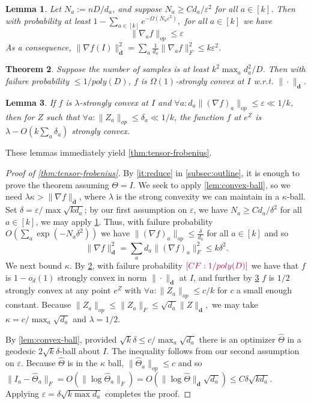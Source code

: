 \documentclass{article}
\newtheorem{theorem}{Theorem}
\newtheorem{lemma}[theorem]{Lemma}
\renewcommand{\vec}{\bm}
\newcommand\eps{\varepsilon}
\newcommand{\CF}[1]{{\color{purple}[CF: #1]}}
\begin{document}
\begin{lemma}\label{lemma:gradient-bound} Let $N_a := n D/d_a$, and suppose $N_a \geq C d_a/\eps^2$ for all $a \in [k]$. Then with probability at least $1 -  \sum_{a \in [k]} e^{-\Omega(N_a \eps^2)},$ for all $a \in [k]$ we have 
$$\| \nabla_a f \|_{op} \leq \eps$$
As a consequence, $\|\nabla f(I)\|_{\vec d} ^{2} = \sum_{a}\frac{1}{d_a} \|\nabla_a f \|_{F}^{2} \leq k \eps^{2}$. 
\end{lemma}

\begin{theorem}\label{thm:tensor-convexity}
Suppose the number of samples is at least $k^{2} \max_{a} d_{a}^{2}/D$. Then with failure probability $\leq 1/poly(D)$, $f$ is $\Omega(1)$-strongly convex at $I$ w.r.t. $\|\cdot \|_{\vec d}$.
\end{theorem}

\begin{lemma}\label{lem:perturbation}
If $f$ is $\lambda$-strongly convex at $I$ and $\forall a: d_{a} \|(\nabla f)_{a}\|_{op} \leq \eps \ll 1/k$, then for $Z$ such that $\forall a: \|Z_{a}\|_{op} \leq \delta_{a} \ll 1/k$, the function $f$ at $e^{Z}$ is $\lambda - O(k \sum_{a} \delta_{a})$ strongly convex. 
\end{lemma}

These lemmas immediately yield \cref{thm:tensor-frobenius}. 
\begin{proof}[Proof of \cref{thm:tensor-frobenius}]By \cref{it:reduce} in \cref{subsec:outline}, it is enough to prove the theorem assuming $\Theta = I$. 
We seek to apply \cref{lem:convex-ball}, so we need $\lambda \kappa > \|\nabla f\|_{\vec d}$, where $\lambda$ is the strong convexity we can maintain in a $\kappa$-ball. Set $\delta = \eps/\max \sqrt{k d_a}$; by our first assumption on $\eps$, we have $N_a \geq C d_a/\delta^2$ for all $a \in [k]$, we may apply \cref{lemma:gradient-bound}. Thus, with failure probability $O\left( \sum_a \exp ( - N_a \delta^2)\right)$ we have $\|(\nabla f)_{a}\|_{op} \leq \frac{\delta}{d_{a}}$ for all $a \in [k]$ and so
\[  \|\nabla f\|_{\vec d}^{2} = \sum_{a} d_{a} \|(\nabla f)_{a}\|_{F}^{2} \leq  k \delta^{2}.  \]
We next bound $\kappa$. By \cref{thm:tensor-convexity}, with failure probability $\CF{1/poly(D)}$ we have that $f$ is $1-o_{d}(1)$ strongly convex in norm $\|\cdot\|_{\vec d}$ at $I$, and further by \cref{lem:perturbation} $f$ is $1/2$ strongly convex at any point $e^{Z}$ with $\forall a: \|Z_{a}\|_{op} \leq  c/k$ for $c$ a small enough constant. Because $\|Z_a\|_{op} \leq \|Z_a\|_F \leq \sqrt{d_a} \|Z\|_{\vec d},$ we may take $\kappa = c/\max_a \sqrt{d_a}$ and $\lambda = 1/2$.

By \cref{lem:convex-ball}, provided $\sqrt{k} \delta \leq c/\max_a \sqrt{d_a} $ there is an optimizer $\widehat{\Theta}$ in a geodesic $2 \sqrt{k} \delta$-ball about $I$. The inequality follows from our second assumption on $\eps$. Because $\widehat{\Theta}$ is in the $\kappa$ ball, $\|\widehat{\Theta}_a\|_{op} \leq c$ and so $\|I_a - \widehat{\Theta}_a\|_F = O( \| \log \widehat{\Theta}_a\|_F) = O( \|\log \widehat{\Theta}\|_{\vec d} \sqrt{d_a})  \leq C \delta \sqrt{k d_a}.$ Applying $\eps = \delta \sqrt{k \max d_a}$ completes the proof.
\end{proof}
\end{document}
